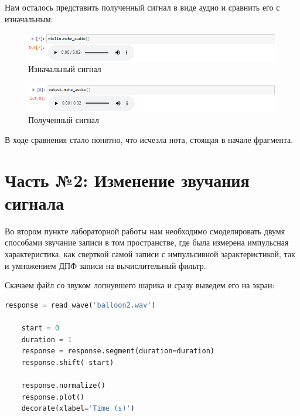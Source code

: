 \documentclass[a4paper]{article}
\begin{document}
            Нам осталось представить полученный сигнал в виде аудио и сравнить его с изначальным:
            
            \begin{figure}[H]
                \centering
                \includegraphics[width=\textwidth]{ex_1_6.png}
                \caption{Изначальный сигнал}
                \label{fig:ex_1_6}
            \end{figure}
            
            \begin{figure}[H]
                \centering
                \includegraphics[width=\textwidth]{ex_1_7.png}
                \caption{Полученный сигнал}
                \label{fig:ex_1_7}
            \end{figure}
            
            В ходе сравнения стало понятно, что исчезла нота, стоящая в начале фрагмента.
            
    \newpage
        \section{Часть №2: Изменение звучания сигнала}
            Во втором пункте лабораторной работы нам необходимо  смоделировать двумя способами звучание записи в том пространстве, где была измерена импульсная характеристика, как сверткой самой записи с импульсивной зарактеристикой, так и умножением ДПФ записи на вычислительный фильтр.
            
            Скачаем файл со звуком лопнувшего шарика и сразу выведем его на экран:
            
\begin{lstlisting}[language=Python, caption= Получение сигнала]
    response = read_wave('balloon2.wav')

    start = 0
    duration = 1
    response = response.segment(duration=duration)
    response.shift(-start)
    
    response.normalize()
    response.plot()
    decorate(xlabel='Time (s)')
\end{lstlisting}
            
\end{document}
